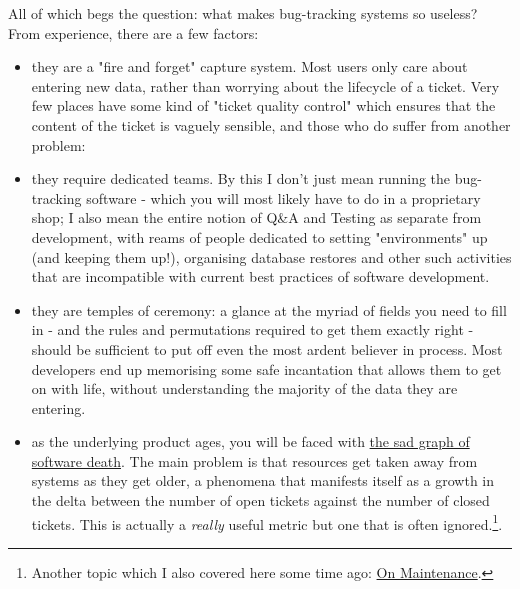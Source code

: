 \documentclass{book}
\begin{document}
All of which begs the question: what makes bug-tracking systems so
useless? From experience, there are a few factors:

\begin{itemize}
\item they are a "fire and forget" capture system. Most users only care
about entering new data, rather than worrying about the lifecycle of
a ticket. Very few places have some kind of "ticket quality control"
which ensures that the content of the ticket is vaguely sensible,
and those who do suffer from another problem:
\item they require dedicated teams. By this I don't just mean running the
bug-tracking software - which you will most likely have to do in a
proprietary shop; I also mean the entire notion of Q\&A and Testing
as separate from development, with reams of people dedicated to
setting "environments" up (and keeping them up!), organising
database restores and other such activities that are incompatible
with current best practices of software development.
\item they are temples of ceremony: a glance at the myriad of fields you
need to fill in - and the rules and permutations required to get
them exactly right - should be sufficient to put off even the most
ardent believer in process. Most developers end up memorising some
safe incantation that allows them to get on with life, without
understanding the majority of the data they are entering.
\item as the underlying product ages, you will be faced with \href{http://tinyletter.com/programming-beyond-practices/letters/the-sad-graph-of-software-death}{the sad graph
of software death}. The main problem is that resources get taken away
from systems as they get older, a phenomena that manifests itself as
a growth in the delta between the number of open tickets against the
number of closed tickets. This is actually a \emph{really} useful metric
but one that is often ignored.\footnote{Another topic which I also covered here some time
ago: \href{http://mcraveiro.blogspot.co.uk/2007/05/nerd-food-on-maintenance.html}{On Maintenance}.}.
\end{itemize}
\end{document}
